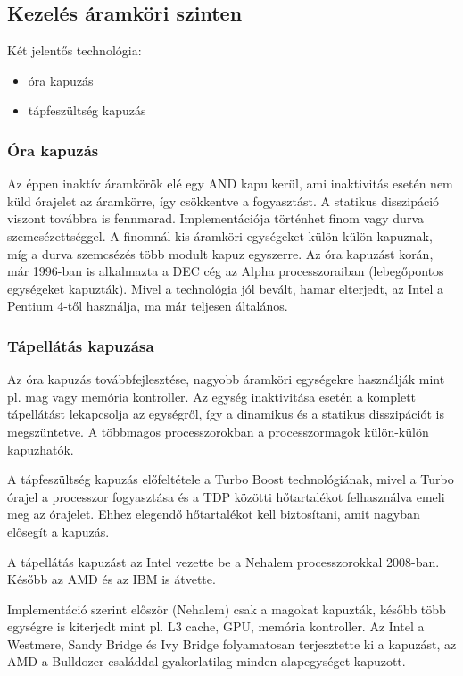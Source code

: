 \subsection{Kezelés áramköri szinten}
Két jelentős technológia:
\begin{itemize}
    \item óra kapuzás
    \item tápfeszültség kapuzás
\end{itemize}

\subsubsection{Óra kapuzás}
Az éppen inaktív áramkörök elé egy AND kapu kerül, ami inaktivitás esetén nem küld órajelet az áramkörre, így csökkentve a fogyasztást.
A statikus disszipáció viszont továbbra is fennmarad.
Implementációja történhet finom vagy durva szemcsézettséggel.
A finomnál kis áramköri egységeket külön-külön kapuznak, míg a durva szemcsézés több modult kapuz egyszerre.
Az óra kapuzást korán, már 1996-ban is alkalmazta a DEC cég az Alpha processzoraiban (lebegőpontos egységeket kapuzták).
Mivel a technológia jól bevált, hamar elterjedt, az Intel a Pentium 4-től használja, ma már teljesen általános.

\subsubsection{Tápellátás kapuzása}
Az óra kapuzás továbbfejlesztése, nagyobb áramköri egységekre használják mint pl. mag vagy memória kontroller.
Az egység inaktivitása esetén a komplett tápellátást lekapcsolja az egységről, így a dinamikus és a statikus disszipációt is megszüntetve.
A többmagos processzorokban a processzormagok külön-külön kapuzhatók.

A tápfeszültség kapuzás előfeltétele a Turbo Boost technológiának, mivel a Turbo órajel a processzor fogyasztása és a TDP közötti hőtartalékot felhasználva emeli meg az órajelet.
Ehhez elegendő hőtartalékot kell biztosítani, amit nagyban elősegít a kapuzás.

A tápellátás kapuzást az Intel vezette be a Nehalem processzorokkal 2008-ban.
Később az AMD és az IBM is átvette.

Implementáció szerint először (Nehalem) csak a magokat kapuzták, később több egységre is kiterjedt mint pl. L3 cache, GPU, memória kontroller.
Az Intel a Westmere, Sandy Bridge és Ivy Bridge folyamatosan terjesztette ki a kapuzást, az AMD a Bulldozer családdal gyakorlatilag minden alapegységet kapuzott.

